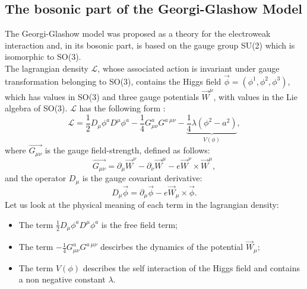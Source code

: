 \documentclass[main.tex]{subfiles}
\begin{document}
\subsection{The bosonic part of the Georgi-Glashow Model}
The Georgi-Glashow model was proposed as a theory for the electroweak interaction and, in its bosonic part, is based on the gauge group SU(2) which is isomorphic to SO(3).\\
The lagrangian density $\mathcal{L}$, whose associated action is invariant under gauge transformation belonging to SO(3), contains the Higgs field $\vec{\phi} = ( \phi^1, \phi^2 , \phi^3)$, which has values in SO(3) and three gauge potentials $\Vec{W}^\mu$, with values in the Lie algebra of SO(3). 
$\mathcal{L}$ has the following form : 
\begin{equation}
\mathcal{L}= \frac{1}{2}D_{\mu}\phi^a D^\mu \phi^a  -\frac{1}{4} G_{\mu \nu}^a G^{a \ \mu \nu} - \underbrace{\frac{1}{4}\lambda (\phi^2 -a^2)}_{V(\phi)},
\label{eq:lag}
\end{equation}
where $\Vec{G_{\mu \nu}}$ is the gauge field-strength, defined as follows:
\begin{equation}
\Vec{G_{\mu \nu}} = \partial_{\mu}  \Vec{W}^\nu -\partial_{\nu}  \Vec{W}^\mu - e \Vec{W}^\nu \times \Vec{W}^\mu,
\end{equation}
and the operator $D_{\mu}$ is the gauge covariant derivative: 
\begin{equation}
D_\mu \Vec{\phi} = \partial_\mu \Vec{\phi} - e \Vec{W}_\mu \times \Vec{\phi}.
\end{equation}
Let us look at the physical meaning of each term in the lagrangian density:
\begin{itemize}
    \item The term $\frac{1}{2}D_{\mu}\phi^a D^\mu \phi^a $ is the free field term;
    \item The term  $-\frac{1}{4} G_{\mu \nu}^a G^{a \ \mu \nu}$ descirbes the dynamics of the potential $\Vec{W}_{\mu}$;
    \item The term  $V(\phi) $ describes the self interaction of the Higgs field and contains a non negative constant $\lambda$.
\end{itemize}
\end{document}
